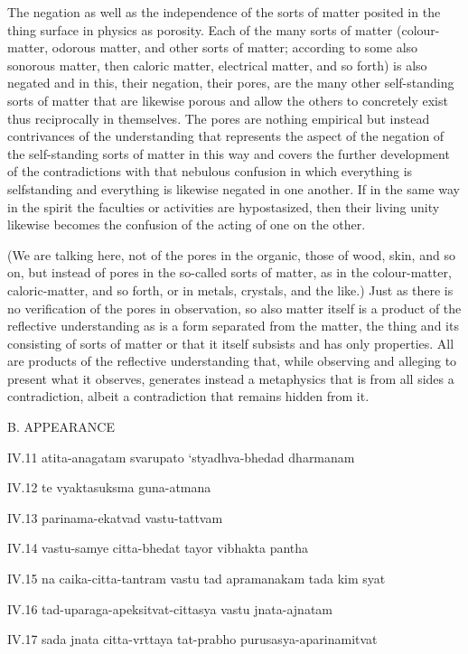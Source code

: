     The negation as well as the independence of the sorts of matter
    posited in the thing surface in physics as porosity.
    Each of the many sorts of matter
    (colour-matter, odorous matter, and other sorts of matter;
    according to some also sonorous matter, then caloric matter,
    electrical matter, and so forth)
    is also negated and in this, their negation,
    their pores, are the many other self-standing sorts of
    matter that are likewise porous and allow the others to concretely
    exist thus reciprocally in themselves.
    The pores are nothing empirical but instead contrivances of
    the understanding that represents the
    aspect of the negation of the self-standing sorts of matter in this
    way and covers the further development of the contradictions with
    that nebulous confusion in which everything is selfstanding and
    everything is likewise negated in one another.
    If in the same way in the spirit
    the faculties or activities are hypostasized,
    then their living unity likewise becomes
    the confusion of the acting of one on the other.

    (We are talking here, not of the pores in the organic,
    those of wood, skin, and so on, but instead of pores
    in the so-called sorts of matter, as in the colour-matter,
    caloric-matter, and so forth, or in metals, crystals, and the like.)
    Just as there is no verification of the pores in observation,
    so also matter itself is a product of the reflective understanding as
    is a form separated from the matter, the thing and its consisting of
    sorts of matter or that it itself subsists and has only properties.
    All are products of the reflective understanding that,
    while observing and alleging to present what it observes,
    generates instead a metaphysics that is from all sides a contradiction,
    albeit a contradiction that remains hidden from it.

B. APPEARANCE

IV.11
atita-anagatam svarupato ‘styadhva-bhedad dharmanam

IV.12
te vyaktasuksma guna-atmana

IV.13
parinama-ekatvad vastu-tattvam

IV.14
vastu-samye citta-bhedat tayor vibhakta pantha

IV.15
na caika-citta-tantram vastu tad apramanakam tada kim syat

IV.16
tad-uparaga-apeksitvat-cittasya vastu jnata-ajnatam

IV.17
sada jnata citta-vrttaya tat-prabho purusasya-aparinamitvat

